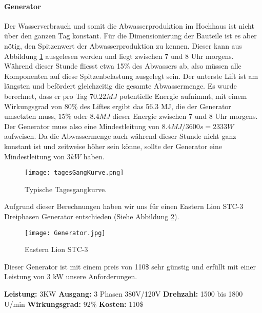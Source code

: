 \paragraph{Generator} \label{para:generator}
Der Wasserverbrauch und somit die Abwasserproduktion im Hochhaus ist nicht über den ganzen Tag konstant. Für die Dimensionierung der Bauteile ist es aber nötig, den Spitzenwert der Abwasserproduktion zu kennen. Dieser kann aus Abbildung \ref{fig:tagesGangKurve} ausgelesen werden und liegt zwischen 7 und 8 Uhr morgens. Während dieser Stunde fliesst etwa 15\% des Abwassers ab, also müssen alle Komponenten auf diese Spitzenbelastung ausgelegt sein. 
Der unterste Lift ist am längsten und befördert gleichzeitig die gesamte Abwassermenge. Es wurde berechnet, dass er pro Tag \(70.22 MJ\) potentielle Energie aufnimmt, mit einem Wirkungsgrad von 80\% des Liftes ergibt das 56.3 MJ, die der Generator umsetzten muss, \(15\%\) oder \(8.4 MJ\) dieser Energie zwischen 7 und 8 Uhr morgens. Der Generator muss also eine Mindestleitung von \(8.4 MJ / 3600 s = 2333 W \) aufweisen. Da die Abwassermenge auch während dieser Stunde nicht ganz konstant ist und zeitweise höher sein könne, sollte der Generator eine Mindestleitung von \(3 kW\) haben.

\begin{figure}[H]
\centering
\texttt{[image: tagesGangKurve.png]}
\caption{Typische Tagesgangkurve. \cite{peakWaterDemand}}
\label{fig:tagesGangKurve}
\end{figure}

Aufgrund dieser Berechnungen haben wir uns für einen Eastern Lion STC-3 Dreiphasen Generator entschieden (Siehe Abbildung \ref{fig:Generator}).  

\begin{figure}[H]
\centering
\texttt{[image: Generator.jpg]}
\caption{Eastern Lion STC-3 \cite{generator}}
\label{fig:Generator}
\end{figure}

Dieser Generator ist mit einem preis von 110\$ sehr günstig und erfüllt mit einer Leistung von 3 kW unsere Anforderungen.

\textbf{Leistung:}		3KW \newline
\textbf{Ausgang:}		3 Phasen 380V/120V \newline
\textbf{Drehzahl:}		1500 bis 1800 U/min \newline
\textbf{Wirkungsgrad:}	92\% \newline
\textbf{Kosten:}		110\$ \newline

